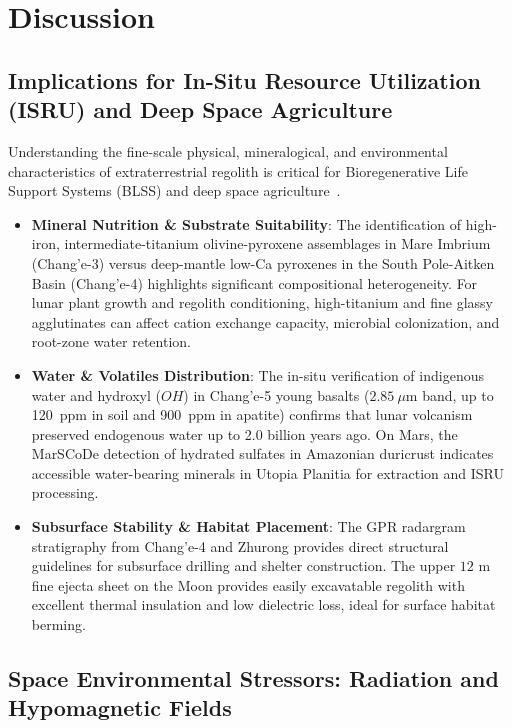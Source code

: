 \section{Discussion}

\subsection{Implications for In-Situ Resource Utilization (ISRU) and Deep Space Agriculture}

Understanding the fine-scale physical, mineralogical, and environmental characteristics of extraterrestrial regolith is critical for Bioregenerative Life Support Systems (BLSS) and deep space agriculture~\cite{porterfield2025blss}. 

\begin{itemize}
    \item \textbf{Mineral Nutrition \& Substrate Suitability}: The identification of high-iron, intermediate-titanium olivine-pyroxene assemblages in Mare Imbrium (Chang'e-3) versus deep-mantle low-Ca pyroxenes in the South Pole-Aitken Basin (Chang'e-4) highlights significant compositional heterogeneity. For lunar plant growth and regolith conditioning, high-titanium and fine glassy agglutinates can affect cation exchange capacity, microbial colonization, and root-zone water retention.
    \item \textbf{Water \& Volatiles Distribution}: The in-situ verification of indigenous water and hydroxyl ($OH$) in Chang'e-5 young basalts ($2.85~\mu\text{m}$ band, up to 120~ppm in soil and 900~ppm in apatite) confirms that lunar volcanism preserved endogenous water up to 2.0 billion years ago. On Mars, the MarSCoDe detection of hydrated sulfates in Amazonian duricrust indicates accessible water-bearing minerals in Utopia Planitia for extraction and ISRU processing.
    \item \textbf{Subsurface Stability \& Habitat Placement}: The GPR radargram stratigraphy from Chang'e-4 and Zhurong provides direct structural guidelines for subsurface drilling and shelter construction. The upper $12\text{ m}$ fine ejecta sheet on the Moon provides easily excavatable regolith with excellent thermal insulation and low dielectric loss, ideal for surface habitat berming.
\end{itemize}

\subsection{Space Environmental Stressors: Radiation and Hypomagnetic Fields}


